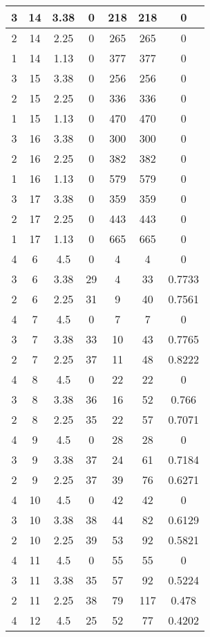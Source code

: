 \documentclass[letterpaper, 12pt]{article}
\begin{document}
\begin{longtable}{|c|c|c|c|c|c|c|}
\hline
3 & 14 & 3.38 & 0 & 218 & 218 & 0 \\
\hline
2 & 14 & 2.25 & 0 & 265 & 265 & 0 \\
\hline
1 & 14 & 1.13 & 0 & 377 & 377 & 0 \\
\hline
3 & 15 & 3.38 & 0 & 256 & 256 & 0 \\
\hline
2 & 15 & 2.25 & 0 & 336 & 336 & 0 \\
\hline
1 & 15 & 1.13 & 0 & 470 & 470 & 0 \\
\hline
3 & 16 & 3.38 & 0 & 300 & 300 & 0 \\
\hline
2 & 16 & 2.25 & 0 & 382 & 382 & 0 \\
\hline
1 & 16 & 1.13 & 0 & 579 & 579 & 0 \\
\hline
3 & 17 & 3.38 & 0 & 359 & 359 & 0 \\
\hline
2 & 17 & 2.25 & 0 & 443 & 443 & 0 \\
\hline
1 & 17 & 1.13 & 0 & 665 & 665 & 0 \\
\hline
4 & 6 & 4.5 & 0 & 4 & 4 & 0 \\
\hline
3 & 6 & 3.38 & 29 & 4 & 33 & 0.7733 \\
\hline
2 & 6 & 2.25 & 31 & 9 & 40 & 0.7561 \\
\hline
4 & 7 & 4.5 & 0 & 7 & 7 & 0 \\
\hline
3 & 7 & 3.38 & 33 & 10 & 43 & 0.7765 \\
\hline
2 & 7 & 2.25 & 37 & 11 & 48 & 0.8222 \\
\hline
4 & 8 & 4.5 & 0 & 22 & 22 & 0 \\
\hline
3 & 8 & 3.38 & 36 & 16 & 52 & 0.766 \\
\hline
2 & 8 & 2.25 & 35 & 22 & 57 & 0.7071 \\
\hline
4 & 9 & 4.5 & 0 & 28 & 28 & 0 \\
\hline
3 & 9 & 3.38 & 37 & 24 & 61 & 0.7184 \\
\hline
2 & 9 & 2.25 & 37 & 39 & 76 & 0.6271 \\
\hline
4 & 10 & 4.5 & 0 & 42 & 42 & 0 \\
\hline
3 & 10 & 3.38 & 38 & 44 & 82 & 0.6129 \\
\hline
2 & 10 & 2.25 & 39 & 53 & 92 & 0.5821 \\
\hline
4 & 11 & 4.5 & 0 & 55 & 55 & 0 \\
\hline
3 & 11 & 3.38 & 35 & 57 & 92 & 0.5224 \\
\hline
2 & 11 & 2.25 & 38 & 79 & 117 & 0.478 \\
\hline
4 & 12 & 4.5 & 25 & 52 & 77 & 0.4202 \\

\end{longtable}
\end{document}
